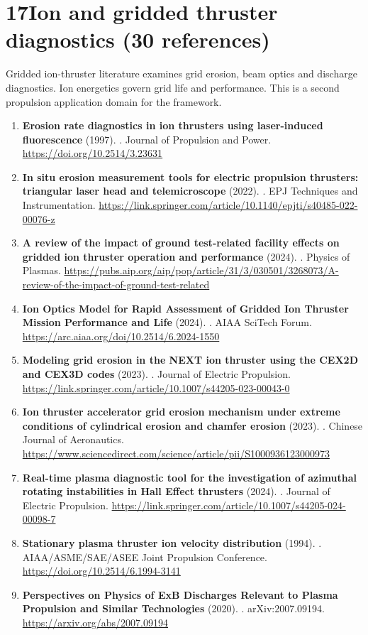 \documentclass[11pt,a4paper]{article}
\begin{document}
\section*{17\quad Ion and gridded thruster diagnostics \textnormal{(\normalsize 30 references)}}
Gridded ion-thruster literature examines grid erosion, beam optics and discharge diagnostics. Ion energetics govern grid life and performance. This is a second propulsion application domain for the framework.
\begin{enumerate}[leftmargin=1.4em]
\item \textbf{Erosion rate diagnostics in ion thrusters using laser-induced fluorescence} (1997). . Journal of Propulsion and Power. \url{https://doi.org/10.2514/3.23631}
\item \textbf{In situ erosion measurement tools for electric propulsion thrusters: triangular laser head and telemicroscope} (2022). . EPJ Techniques and Instrumentation. \url{https://link.springer.com/article/10.1140/epjti/s40485-022-00076-z}
\item \textbf{A review of the impact of ground test-related facility effects on gridded ion thruster operation and performance} (2024). . Physics of Plasmas. \url{https://pubs.aip.org/aip/pop/article/31/3/030501/3268073/A-review-of-the-impact-of-ground-test-related}
\item \textbf{Ion Optics Model for Rapid Assessment of Gridded Ion Thruster Mission Performance and Life} (2024). . AIAA SciTech Forum. \url{https://arc.aiaa.org/doi/10.2514/6.2024-1550}
\item \textbf{Modeling grid erosion in the NEXT ion thruster using the CEX2D and CEX3D codes} (2023). . Journal of Electric Propulsion. \url{https://link.springer.com/article/10.1007/s44205-023-00043-0}
\item \textbf{Ion thruster accelerator grid erosion mechanism under extreme conditions of cylindrical erosion and chamfer erosion} (2023). . Chinese Journal of Aeronautics. \url{https://www.sciencedirect.com/science/article/pii/S1000936123000973}
\item \textbf{Real-time plasma diagnostic tool for the investigation of azimuthal rotating instabilities in Hall Effect thrusters} (2024). . Journal of Electric Propulsion. \url{https://link.springer.com/article/10.1007/s44205-024-00098-7}
\item \textbf{Stationary plasma thruster ion velocity distribution} (1994). . AIAA/ASME/SAE/ASEE Joint Propulsion Conference. \url{https://doi.org/10.2514/6.1994-3141}
\item \textbf{Perspectives on Physics of ExB Discharges Relevant to Plasma Propulsion and Similar Technologies} (2020). . arXiv:2007.09194. \url{https://arxiv.org/abs/2007.09194}

\end{enumerate}
\end{document}
